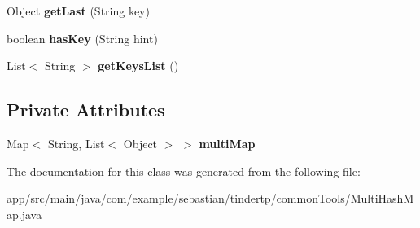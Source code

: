 \begin{DoxyCompactItemize}
\item 
Object {\bfseries get\+Last} (String key)\hypertarget{classcom_1_1example_1_1sebastian_1_1tindertp_1_1commonTools_1_1MultiHashMap_aee1a1f123c2054cd4940fcd63433f3e8}{}\label{classcom_1_1example_1_1sebastian_1_1tindertp_1_1commonTools_1_1MultiHashMap_aee1a1f123c2054cd4940fcd63433f3e8}

\item 
boolean {\bfseries has\+Key} (String hint)\hypertarget{classcom_1_1example_1_1sebastian_1_1tindertp_1_1commonTools_1_1MultiHashMap_a404c4dcfd6a8a580a9c87157502f4b25}{}\label{classcom_1_1example_1_1sebastian_1_1tindertp_1_1commonTools_1_1MultiHashMap_a404c4dcfd6a8a580a9c87157502f4b25}

\item 
List$<$ String $>$ {\bfseries get\+Keys\+List} ()\hypertarget{classcom_1_1example_1_1sebastian_1_1tindertp_1_1commonTools_1_1MultiHashMap_a561171e0f69d463c024fd637dfe18ad8}{}\label{classcom_1_1example_1_1sebastian_1_1tindertp_1_1commonTools_1_1MultiHashMap_a561171e0f69d463c024fd637dfe18ad8}

\end{DoxyCompactItemize}
\subsection*{Private Attributes}
\begin{DoxyCompactItemize}
\item 
Map$<$ String, List$<$ Object $>$ $>$ {\bfseries multi\+Map}\hypertarget{classcom_1_1example_1_1sebastian_1_1tindertp_1_1commonTools_1_1MultiHashMap_ac4c741dbf812ac437434af8af3b0676a}{}\label{classcom_1_1example_1_1sebastian_1_1tindertp_1_1commonTools_1_1MultiHashMap_ac4c741dbf812ac437434af8af3b0676a}

\end{DoxyCompactItemize}


The documentation for this class was generated from the following file\+:\begin{DoxyCompactItemize}
\item 
app/src/main/java/com/example/sebastian/tindertp/common\+Tools/Multi\+Hash\+Map.\+java\end{DoxyCompactItemize}
